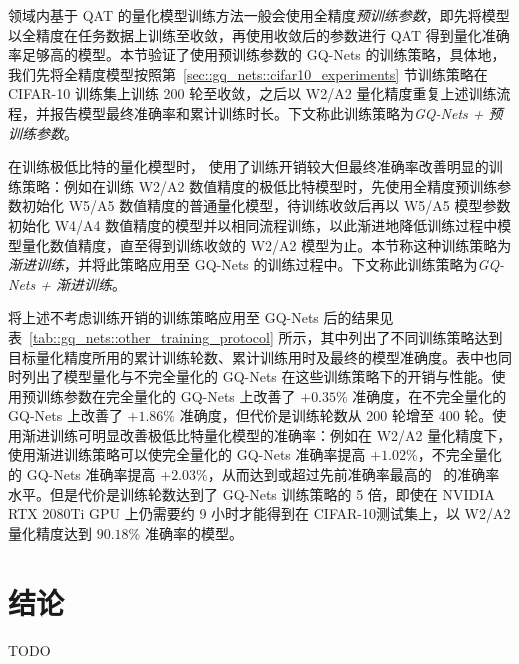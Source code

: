 领域内基于 QAT 的量化模型训练方法一般会使用全精度\emph{预训练参数}，即先将模型以全精度在任务数据上训练至收敛，再使用收敛后的参数进行 QAT 得到量化准确率足够高的模型。本节验证了使用预训练参数的 GQ-Nets 的训练策略，具体地，我们先将全精度模型按照第~\ref{sec::gq_nets::cifar10_experiments} 节训练策略在 CIFAR-10 训练集上训练 200 轮至收敛，之后以 W2/A2 量化精度重复上述训练流程，并报告模型最终准确率和累计训练时长。下文称此训练策略为\emph{GQ-Nets + 预训练参数}。

在训练极低比特的量化模型时，\citet{li2019additive} 使用了训练开销较大但最终准确率改善明显的训练策略：例如在训练 W2/A2 数值精度的极低比特模型时，先使用全精度预训练参数初始化 W5/A5 数值精度的普通量化模型，待训练收敛后再以 W5/A5 模型参数初始化 W4/A4 数值精度的模型并以相同流程训练，以此渐进地降低训练过程中模型量化数值精度，直至得到训练收敛的 W2/A2 模型为止。本节称这种训练策略为\emph{渐进训练}，并将此策略应用至 GQ-Nets 的训练过程中。下文称此训练策略为\emph{GQ-Nets + 渐进训练}。

将上述不考虑训练开销的训练策略应用至 GQ-Nets 后的结果见表~\ref{tab::gq_nets::other_training_protocol} 所示，其中列出了不同训练策略达到目标量化精度所用的累计训练轮数、累计训练用时及最终的模型准确度。表中也同时列出了模型量化与不完全量化的 GQ-Nets 在这些训练策略下的开销与性能。使用预训练参数在完全量化的 GQ-Nets 上改善了 $+0.35\%$ 准确度，在不完全量化的 GQ-Nets 上改善了 $+1.86\%$ 准确度，但代价是训练轮数从 200 轮增至 400 轮。使用渐进训练可明显改善极低比特量化模型的准确率：例如在 W2/A2 量化精度下，使用渐进训练策略可以使完全量化的 GQ-Nets 准确率提高 $+1.02\%$，不完全量化的 GQ-Nets 准确率提高 $+2.03\%$，从而达到或超过先前准确率最高的~\citet{Zhang_2018, li2019additive} 的准确率水平。但是代价是训练轮数达到了 GQ-Nets 训练策略的 5 倍，即使在 NVIDIA RTX 2080Ti GPU 上仍需要约 9 小时才能得到在 CIFAR-10测试集上，以 W2/A2 量化精度达到 $90.18\%$ 准确率的模型。
\section{结论}
TODO


